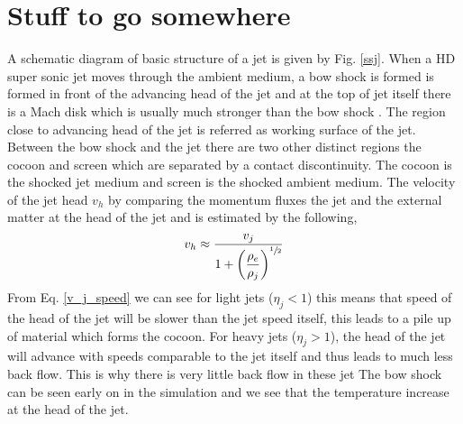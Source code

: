 \documentclass[12pt]{ociamthesis}
\newcommand{\eref}[1]{Eq. \eqref{#1}}
\newcommand{\fref}[1]{Fig. \eqref{#1}}
\begin{document}
\section{Stuff to go somewhere}
\par A schematic diagram of basic structure of a jet is given by \fref{ssj}. When a HD super sonic jet moves through the ambient medium, a bow shock is formed is formed in front of the advancing head of the jet and at the top of jet itself there is a Mach disk which is usually much stronger than the bow shock \citep{Chakrabarti1988}. The region close to advancing head of the jet is referred as working surface of the jet. Between the bow shock and the jet there are two other distinct regions the cocoon and screen which are separated by a contact discontinuity. The cocoon is the shocked jet medium and screen is the shocked ambient medium. The velocity of the jet head $v_h$ by comparing the momentum fluxes the jet and the external matter at the head of the jet and is estimated by the following,
\begin{equation}\label{v_j_speed}
v_h \approx \dfrac{v_j}{1+ \left( \dfrac{\rho_e}{\rho_j} \right)^{\sfrac{1}{2}}} 
\end{equation}
From \eref{v_j_speed} we can see for light jets ($\eta_j<1$) this means that speed of the head of the jet will be slower than the jet speed itself, this leads to a pile up of material which forms the cocoon. For heavy jets ($\eta_j>1$), the head of the jet will advance with speeds comparable to the jet itself and thus leads to much less back flow. This is why there is very little back flow in these jet The bow shock can be seen early on in the simulation and we see that the temperature increase at the head of the jet.
\end{document}

